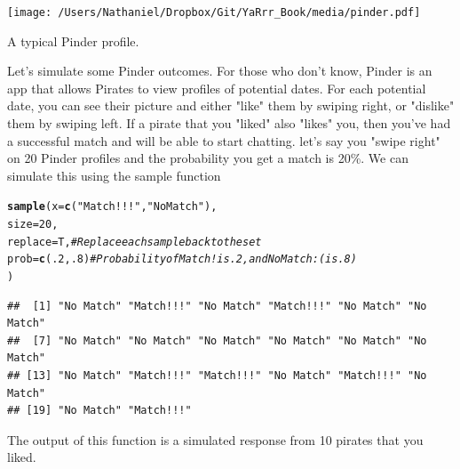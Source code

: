 \documentclass{tufte-book}\usepackage[]{graphicx}\usepackage[]{color}
\makeatletter
\newcommand{\hlnum}[1]{\textcolor[rgb]{0.686,0.059,0.569}{#1}}%
\newcommand{\hlstr}[1]{\textcolor[rgb]{0.192,0.494,0.8}{#1}}%
\newcommand{\hlcom}[1]{\textcolor[rgb]{0.678,0.584,0.686}{\textit{#1}}}%
\newcommand{\hlstd}[1]{\textcolor[rgb]{0.345,0.345,0.345}{#1}}%
\newcommand{\hlkwc}[1]{\textcolor[rgb]{0.333,0.667,0.333}{#1}}%
\newcommand{\hlkwd}[1]{\textcolor[rgb]{0.737,0.353,0.396}{\textbf{#1}}}%
\newenvironment{kframe}{%
 \def\at@end@of@kframe{}%
 \ifinner\ifhmode%
  \def\at@end@of@kframe{\end{minipage}}%
  \begin{minipage}{\columnwidth}%
 \fi\fi%
 \def\FrameCommand##1{\hskip\@totalleftmargin \hskip-\fboxsep
 \colorbox{shadecolor}{##1}\hskip-\fboxsep
     \hskip-\linewidth \hskip-\@totalleftmargin \hskip\columnwidth}%
 \MakeFramed {\advance\hsize-\width
   \@totalleftmargin\z@ \linewidth\hsize
   \@setminipage}}%
 {\par\unskip\endMakeFramed%
 \at@end@of@kframe}
\newenvironment{knitrout}{}{} %
\makeatother
\begin{document}
\begin{marginfigure}
\texttt{[image: /Users/Nathaniel/Dropbox/Git/YaRrr\_Book/media/pinder.pdf]}
\caption{A typical Pinder profile.}
\label{fig:pinder}
\end{marginfigure}


Let's simulate some Pinder outcomes. For those who don't know, Pinder is an app that allows Pirates to view profiles of potential dates. For each potential date, you can see their picture and either "like" them by swiping right, or "dislike" them by swiping left. If a pirate that you "liked" also "likes" you, then you've had a successful match and will be able to start chatting. let's say you "swipe right" on 20 Pinder profiles and the probability you get a match is 20\%. We can simulate this using the sample function

\begin{footnotesize}
\begin{knitrout}
\color{fgcolor}\begin{kframe}
\begin{alltt}
\hlkwd{sample}\hlstd{(}\hlkwc{x} \hlstd{=} \hlkwd{c}\hlstd{(}\hlstr{"Match!!!"}\hlstd{,} \hlstr{"No Match"}\hlstd{),}
       \hlkwc{size} \hlstd{=} \hlnum{20}\hlstd{,}
       \hlkwc{replace} \hlstd{= T,} \hlcom{# Replace each sample back to the set}
       \hlkwc{prob} \hlstd{=} \hlkwd{c}\hlstd{(}\hlnum{.2}\hlstd{,} \hlnum{.8}\hlstd{)}  \hlcom{# Probability of Match! is .2, and No Match :( is .8)}
       \hlstd{)}
\end{alltt}
\begin{verbatim}
##  [1] "No Match" "Match!!!" "No Match" "Match!!!" "No Match" "No Match"
##  [7] "No Match" "No Match" "No Match" "No Match" "No Match" "No Match"
## [13] "No Match" "Match!!!" "Match!!!" "No Match" "Match!!!" "No Match"
## [19] "No Match" "Match!!!"
\end{verbatim}
\end{kframe}
\end{knitrout}
\end{footnotesize}

The output of this function is a simulated response from 10 pirates that you liked. 

\end{document}

